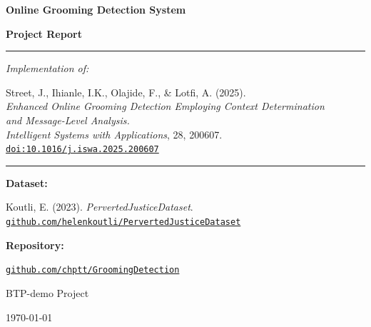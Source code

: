 \documentclass[12pt,a4paper]{article}
\begin{document}
\begin{titlepage}
  \centering
  \vspace*{2cm}

  {\Huge\bfseries\color{sectionblue} Online Grooming Detection System \par}
  \vspace{0.4cm}
  {\Large\bfseries Project Report \par}
  \vspace{1.2cm}

  \rule{\linewidth}{0.5pt}
  \vspace{0.4cm}

  {\large\itshape Implementation of:\par}
  \vspace{0.3cm}
  {\normalsize
    Street, J., Ihianle, I.K., Olajide, F., \& Lotfi, A. (2025).\\
    \textit{Enhanced Online Grooming Detection Employing Context Determination}\\
    \textit{and Message-Level Analysis.}\\
    \textit{Intelligent Systems with Applications}, 28, 200607.\\
    \href{https://doi.org/10.1016/j.iswa.2025.200607}
         {\texttt{doi:10.1016/j.iswa.2025.200607}}
  \par}

  \vspace{0.8cm}
  \rule{\linewidth}{0.5pt}
  \vspace{0.8cm}

  {\large\textbf{Dataset:}\par}
  \vspace{0.2cm}
  {\normalsize
    Koutli, E. (2023). \textit{PervertedJusticeDataset}.\\
    \href{https://github.com/helenkoutli/PervertedJusticeDataset}
         {\texttt{github.com/helenkoutli/PervertedJusticeDataset}}
  \par}

  \vspace{1.2cm}

  {\large\textbf{Repository:}\par}
  \vspace{0.2cm}
  {\normalsize
    \href{https://github.com/chptt/GroomingDetection}
         {\texttt{github.com/chptt/GroomingDetection}}
  \par}

  \vfill

  {\normalsize BTP-demo Project\par}
  \vspace{0.3cm}
  {\normalsize\today\par}
\end{titlepage}
\end{document}
